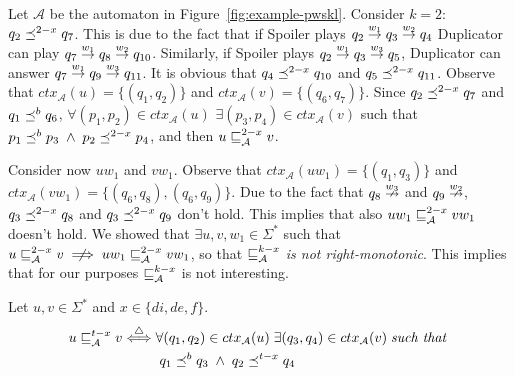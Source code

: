 \begin{example}
\label{example:k-lookahead-words-not-right-monotonic}
Let $\mathcal{A}$ be the automaton in Figure~\ref{fig:example-pwskl}.
Consider $k=2$: $q_2 \preceq^{2-x} q_7$.
This is due to the fact that if Spoiler plays $q_2 \overset{w_1}{\rightarrow} q_3 \overset{w_2}{\rightarrow} q_4$
Duplicator can play $q_7 \overset{w_1}{\rightarrow} q_8 \overset{w_2}{\rightarrow} q_{10}$.
Similarly, if Spoiler plays $q_2 \overset{w_1}{\rightarrow} q_3 \overset{w_3}{\rightarrow} q_5$,
Duplicator can answer $q_7 \overset{w_1}{\rightarrow} q_9 \overset{w_3}{\rightarrow} q_{11}$.
It is obvious that $q_4 \preceq^{2-x} q_{10}$ and $q_5 \preceq^{2-x} q_{11}$.
Observe that $ctx_{\mathcal{A}}(u) = \{(q_1,q_2)\}$ and $ctx_{\mathcal{A}}(v) = \{(q_6,q_7)\}$.
Since $q_2 \preceq^{2-x} q_7$ and $q_1 \preceq^b q_6$, $\forall (p_1,p_2) \in ctx_{\mathcal{A}}(u)$
$\exists (p_3,p_4) \in ctx_{\mathcal{A}}(v)$
such that $p_1 \preceq^b p_3 \; \wedge \; p_2 \preceq^{2-x} p_4$,
and then $u \sqsubseteq_{\mathcal{A}}^{2-x} v$.

Consider now $uw_1$ and $vw_1$.
Observe that $ctx_{\mathcal{A}}(uw_1) = \{(q_1,q_3)\}$ and
$ctx_{\mathcal{A}}(vw_1) = \{(q_6,q_8),(q_6,q_9)\}$.
Due to the fact that $q_8 \overset{w_3}{\nrightarrow}$ and $q_9 \overset{w_2}{\nrightarrow}$,
$q_3 \preceq^{2-x} q_8$ and $q_3 \preceq^{2-x} q_9$ don't hold.
This implies that also $uw_1 \sqsubseteq_{\mathcal{A}}^{2-x} vw_1$ doesn't hold.
We showed that $\exists u,v,w_1 \in \Sigma^*$ such that
$u \pwskl{A}{2}{x} v \centernot\implies uw_1 \pwskl{A}{2}{x} vw_1$,
so that $\sqsubseteq_{\mathcal{A}}^{k-x}$ \emph{is not right-monotonic}.
This implies that for our purposes $\sqsubseteq_{\mathcal{A}}^{k-x}$ is not interesting.
\end{example}


\begin{definition}
Let $u,v \in \Sigma^*$ and $x \in \{di,de,f\}$.
\begin{equation*}
\begin{split}
u \sqsubseteq_{\mathcal{A}}^{t-x} v \overset{\triangle}{\Longleftrightarrow}
& \; \forall (q_1, q_2) \in ctx_{\mathcal{A}}(u) \;\exists (q_3,q_4) \in ctx_{\mathcal{A}}(v) \; \textrm{\emph{such that}}\: \\
& \; \;  q_1 \preceq^b q_3 \; \wedge \; q_2 \preceq^{t-x} q_4
\end{split}
\end{equation*}
\end{definition}

